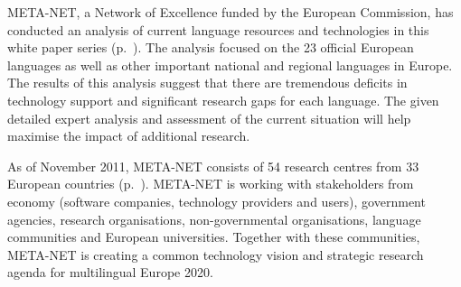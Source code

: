 \begin{Parallel}[c]{78mm}{78mm}
{META-NET, a Network of Excellence funded by the European Commission, has conducted an  analysis of current language resources and technologies in this white paper series (p.~\pageref{whitepaperseries}). The analysis focused on the 23 official European languages as well as other important national and regional languages in Europe. The results of this analysis suggest that there are tremendous deficits in technology support and significant research gaps for each language. The given detailed expert analysis and assessment of the current situation will help maximise the impact of additional research.

As of November 2011, META-NET consists of 54 research centres from 33 European countries (p.~\pageref{metanetmembers}). META-NET is working with stakeholders from economy (software companies, technology providers and users), government agencies, research organisations, non-governmental organisations, language communities and European universities. Together with these communities, META-NET is creating a common technology vision and strategic research agenda for multilingual Europe 2020.} 
\ParallelPar
\end{Parallel}

\makefundingnotice

\cleardoublepage


\renewcommand\contentsname{}
\tableofcontents


\cleardoublepage

\setcounter{page}{1}
\pagestyle{scrheadings}



